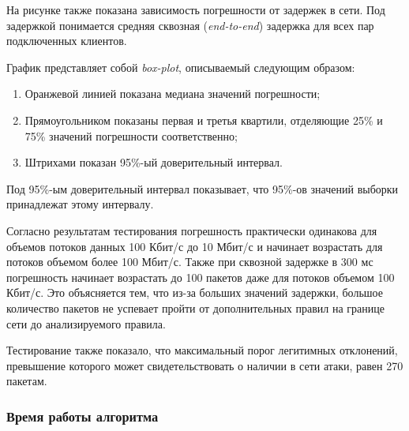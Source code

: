 \documentclass[../thesis.tex]{subfiles}
\begin{document}
На рисунке также показана зависимость погрешности от задержек в сети.
Под задержкой понимается средняя сквозная (\textit{end-to-end}) задержка для всех пар подключенных клиентов.

График представляет собой \textit{box-plot}, описываемый следующим образом:
\begin{enumerate}
\item Оранжевой линией показана медиана значений погрешности;
\item Прямоугольником показаны первая и третья квартили, отделяющие 25\% и 75\% значений погрешности соответственно;
\item Штрихами показан 95\%-ый доверительный интервал.
\end{enumerate}
Под 95\%-ым доверительный интервал показывает, что 95\%-ов значений выборки принадлежат этому интервалу.

Согласно результатам тестирования погрешность практически одинакова для объемов потоков данных 100 Кбит/с до 10 Мбит/с и начинает возрастать для потоков объемом более 100 Мбит/с.
Также при сквозной задержке в 300 мс погрешность начинает возрастать до 100 пакетов даже для потоков объемом 100 Кбит/с.
Это объясняется тем, что из-за больших значений задержки, большое количество пакетов не успевает пройти от дополнительных правил на границе сети до анализируемого правила.

Тестирование также показало, что максимальный порог легитимных отклонений, превышение которого может свидетельствовать о наличии в сети атаки, равен 270 пакетам.

\subsubsection{Время работы алгоритма}
\end{document}
